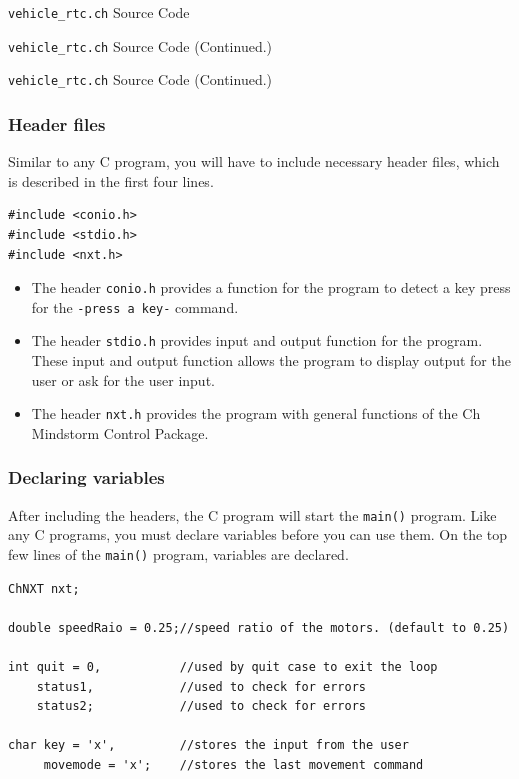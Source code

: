 \documentclass[11pt]{article}
\begin{document}
\begin{Program}[H]
    {\small}
    \caption{\texttt{vehicle\_rtc.ch} Source Code\label{prog_vehicle_rtc.ch}}
\end{Program}
\addtocounter{Program}{-1}
\begin{Program}[H]
    {\small}
    \caption{\texttt{vehicle\_rtc.ch} Source Code (Continued.)\label{prog_vehicle_rtc.ch}}
\end{Program}
\addtocounter{Program}{-1}
\begin{Program}[H]
    {\small}
    \caption{\texttt{vehicle\_rtc.ch} Source Code (Continued.)\label{prog_vehicle_rtc.ch}}
\end{Program}

\subsubsection*{Header files}
Similar to any C program, you will have to include necessary header files, which is described in the 
first four lines.
    
\begin{verbatim}
#include <conio.h>
#include <stdio.h>
#include <nxt.h>
\end{verbatim}

\begin{itemize}
\item The header \verb+conio.h+ provides a function for the program to detect a key press for the
\verb+-press a key-+ command.
\item The header \verb+stdio.h+ provides input and output function for the program. These input and 
output function allows the program to display output for the user or ask for the user input.
\item The header \verb+nxt.h+ provides the program with general functions of the Ch Mindstorm 
Control Package.
\end{itemize}

\subsubsection*{Declaring variables}
After including the headers, the C program will start the \verb+main()+ program.
Like any C programs, you must declare variables before you can use them.
On the top few lines of the \verb+main()+ program, variables are declared.
\begin{verbatim}
ChNXT nxt;

double speedRaio = 0.25;//speed ratio of the motors. (default to 0.25)

int quit = 0,           //used by quit case to exit the loop
    status1,            //used to check for errors
    status2;            //used to check for errors

char key = 'x',	        //stores the input from the user
     movemode = 'x';    //stores the last movement command
\end{verbatim}
\end{document}

